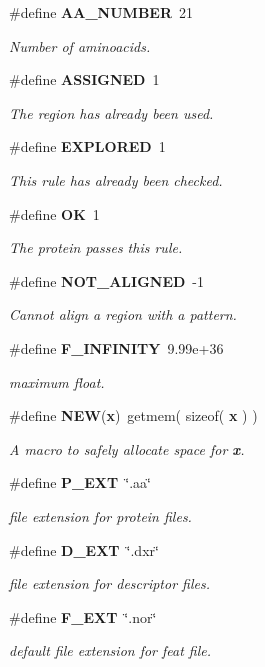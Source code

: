 \begin{CompactItemize}
\#define {\bf AA\_\-NUMBER}\ 21
\begin{CompactList}\small\item\em Number of aminoacids.\item\end{CompactList}\item 
\#define {\bf ASSIGNED}\ 1
\begin{CompactList}\small\item\em The region has already been used.\item\end{CompactList}\item 
\#define {\bf EXPLORED}\ 1
\begin{CompactList}\small\item\em This rule has already been checked.\item\end{CompactList}\item 
\#define {\bf OK}\ 1
\begin{CompactList}\small\item\em The protein passes this rule.\item\end{CompactList}\item 
\#define {\bf NOT\_\-ALIGNED}\ -1
\begin{CompactList}\small\item\em Cannot align a region with a pattern.\item\end{CompactList}\item 
\#define {\bf F\_\-INFINITY}\ 9.99e+36
\begin{CompactList}\small\item\em maximum float.\item\end{CompactList}\item 
\#define {\bf NEW}({\bf x})\ getmem( sizeof( {\bf x} ) )
\begin{CompactList}\small\item\em A macro to safely allocate space for {\em {\bf x}}.\item\end{CompactList}\item 
\#define {\bf P\_\-EXT}\ \char`\"{}.aa\char`\"{}
\begin{CompactList}\small\item\em file extension for protein files.\item\end{CompactList}\item 
\#define {\bf D\_\-EXT}\ \char`\"{}.dxr\char`\"{}
\begin{CompactList}\small\item\em file extension for descriptor files.\item\end{CompactList}\item 
\#define {\bf F\_\-EXT}\ \char`\"{}.nor\char`\"{}
\begin{CompactList}\small\item\em default file extension for feat file.\item\end{CompactList}\end{CompactItemize}
